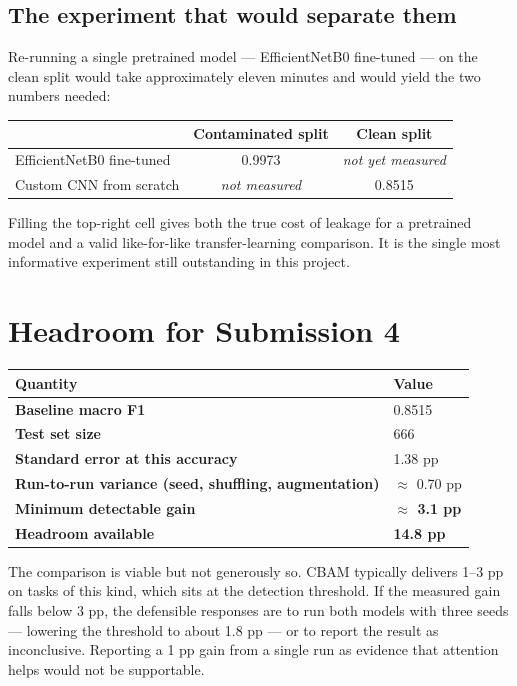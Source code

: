 \documentclass[11pt,a4paper]{article}
\begin{document}
\subsection*{The experiment that would separate them}

Re-running a single pretrained model --- EfficientNetB0 fine-tuned --- on the clean
split would take approximately eleven minutes and would yield the two numbers needed:

\begin{center}
\begin{tabular}{@{}lcc@{}}
\toprule
& \textbf{Contaminated split} & \textbf{Clean split} \\
\midrule
EfficientNetB0 fine-tuned & 0.9973 & \emph{not yet measured} \\
Custom CNN from scratch & \emph{not measured} & 0.8515 \\
\bottomrule
\end{tabular}
\end{center}

Filling the top-right cell gives both the true cost of leakage for a pretrained model and
a valid like-for-like transfer-learning comparison. It is the single most informative
experiment still outstanding in this project.

\section{Headroom for Submission 4}

\begin{tabularx}{\linewidth}{@{}>{\bfseries}p{6.4cm}X@{}}
\toprule
Quantity & Value \\
\midrule
Baseline macro F1 & 0.8515 \\
Test set size & 666 \\
Standard error at this accuracy & 1.38 pp \\
Run-to-run variance (seed, shuffling, augmentation) & $\approx$ 0.70 pp \\
\textbf{Minimum detectable gain} & \textbf{$\approx$ 3.1 pp} \\
\textbf{Headroom available} & \textbf{14.8 pp} \\
\bottomrule
\end{tabularx}

The comparison is viable but not generously so. CBAM typically delivers 1--3 pp on tasks
of this kind, which sits at the detection threshold. If the measured gain falls below
3 pp, the defensible responses are to run both models with three seeds --- lowering the
threshold to about 1.8 pp --- or to report the result as inconclusive. Reporting a 1 pp
gain from a single run as evidence that attention helps would not be supportable.
\end{document}
